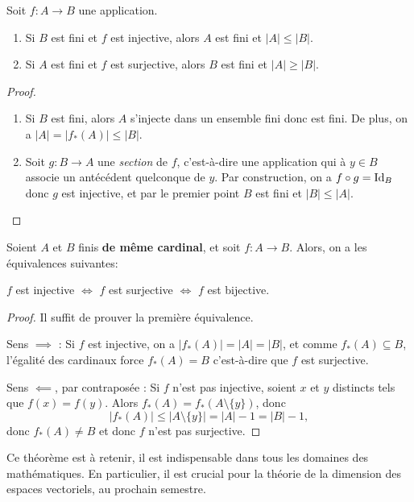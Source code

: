 \begin{proposition}
Soit $f : A\to B$ une application.
\begin{enumerate}
\item Si $B$ est fini et $f$ est injective, alors $A$ est fini et $|A|\leq |B|$.
\item Si $A$ est fini et $f$ est surjective, alors $B$ est fini et $|A|\geq |B|$.
\end{enumerate}
\end{proposition}
\begin{proof}
\begin{enumerate}
\item Si $B$ est fini, alors $A$ s'injecte dans un ensemble fini donc est fini. De plus, on a $|A|=|f_*(A)|\leq |B|$.
\item Soit $g:B\to A$ une \emph{section} de $f$, c'est-à-dire une application  qui à $y\in B$ associe un antécédent quelconque de $y$. Par construction, on a $f\circ g=\operatorname{Id}_{B}$ donc $g$ est injective, et par le premier point $B$ est fini et $|B| \leq |A|$.
\end{enumerate}
\end{proof}

\begin{theoreme}[IMPORTANT]
Soient $A$ et $B$ finis \textbf{de même cardinal}, et soit $f : A\to B$. Alors, on a les équivalences suivantes:
\begin{center}
$f$ est injective $\iff$ $f$ est surjective $\iff$ $f$ est  bijective.
\end{center}
\end{theoreme}
\begin{proof}
Il suffit de prouver la première équivalence.

Sens $\implies$ : Si $f$ est injective, on a $|f_*(A)|=|A|=|B|$, et comme $f_*(A)\subseteq B$, l'égalité des cardinaux force $f_*(A)=B$ c'est-à-dire que $f$ est surjective.

Sens $\impliedby$, par contraposée : Si $f$ n'est pas injective, soient $x$ et $y$ distincts tels que $f(x)=f(y)$. Alors $f_*(A) = f_*(A\setminus \{y\})$, donc 
\[
|f_*(A)| \leq |A\setminus \{y\}| = |A|-1 = |B|-1,
\]
donc $f_*(A) \neq B$ et donc $f$ n'est pas surjective.
\end{proof}

Ce théorème est à retenir, il est indispensable dans tous les domaines des mathématiques. En particulier, il est crucial pour la théorie de la dimension des espaces vectoriels, au prochain semestre.

